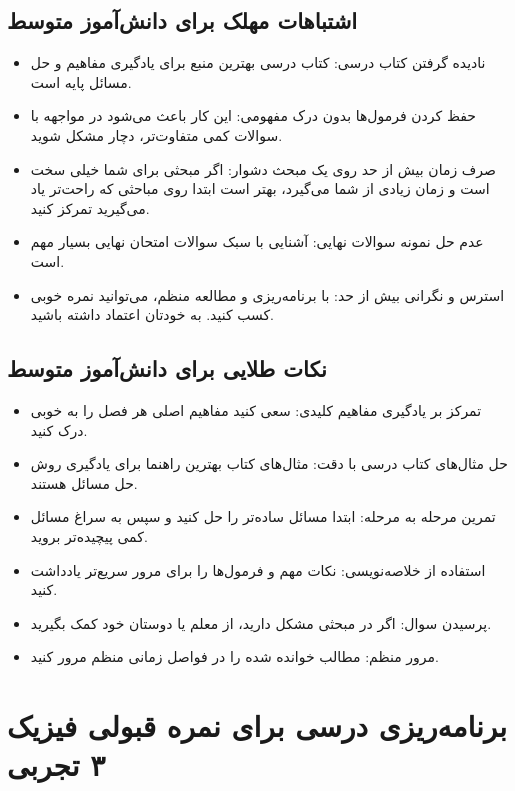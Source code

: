 \documentclass[12pt]{article}
\newcommand{\休息}[1]{\par\centering\textit{#1}\par\vspace{1ex}} %
\begin{document}
\subsection*{اشتباهات مهلک برای دانش‌آموز متوسط}
\begin{itemize}
    \item نادیده گرفتن کتاب درسی: کتاب درسی بهترین منبع برای یادگیری مفاهیم و حل مسائل پایه است.
    \item حفظ کردن فرمول‌ها بدون درک مفهومی: این کار باعث می‌شود در مواجهه با سوالات کمی متفاوت‌تر، دچار مشکل شوید.
    \item صرف زمان بیش از حد روی یک مبحث دشوار: اگر مبحثی برای شما خیلی سخت است و زمان زیادی از شما می‌گیرد، بهتر است ابتدا روی مباحثی که راحت‌تر یاد می‌گیرید تمرکز کنید.
    \item عدم حل نمونه سوالات نهایی: آشنایی با سبک سوالات امتحان نهایی بسیار مهم است.
    \item استرس و نگرانی بیش از حد: با برنامه‌ریزی و مطالعه منظم، می‌توانید نمره خوبی کسب کنید. به خودتان اعتماد داشته باشید.
\end{itemize}

\subsection*{نکات طلایی برای دانش‌آموز متوسط}
\begin{itemize}
    \item تمرکز بر یادگیری مفاهیم کلیدی: سعی کنید مفاهیم اصلی هر فصل را به خوبی درک کنید.
    \item حل مثال‌های کتاب درسی با دقت: مثال‌های کتاب بهترین راهنما برای یادگیری روش حل مسائل هستند.
    \item تمرین مرحله به مرحله: ابتدا مسائل ساده‌تر را حل کنید و سپس به سراغ مسائل کمی پیچیده‌تر بروید.
    \item استفاده از خلاصه‌نویسی: نکات مهم و فرمول‌ها را برای مرور سریع‌تر یادداشت کنید.
    \item پرسیدن سوال: اگر در مبحثی مشکل دارید، از معلم یا دوستان خود کمک بگیرید.
    \item مرور منظم: مطالب خوانده شده را در فواصل زمانی منظم مرور کنید.
\end{itemize}

\newpage
\section*{برنامه‌ریزی درسی برای نمره قبولی فیزیک ۳ تجربی}
\end{document}
